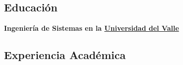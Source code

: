 \noindent\makebox[\linewidth]{\rule{\textwidth}{0.4pt}}

\subsection*{Educación}
\vspace*{0.2cm}
\textbf{Ingeniería de Sistemas en la \href{https://www.univalle.edu.co/}{Universidad del Valle}} \hfill

\noindent\makebox[\linewidth]{\rule{\textwidth}{0.4pt}}

\subsection*{Experiencia Académica}
\vspace*{0.2cm}

